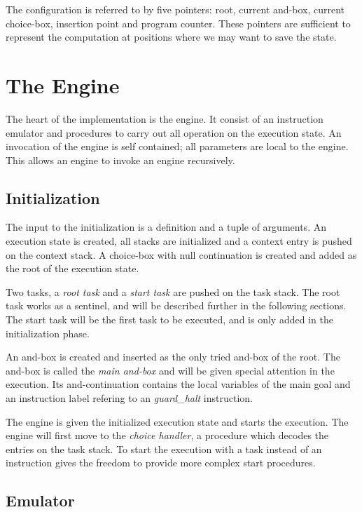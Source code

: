 The configuration is referred to by five pointers: root, current
and-box, current choice-box, insertion point and program counter.
These pointers are sufficient to represent the computation at
positions where we may want to save the state.


\section{The Engine}

The heart of the implementation is the engine. It consist of an
instruction emulator and procedures to carry out all operation on the
execution state. An invocation of the engine is self contained; all
parameters are local to the engine. This allows an engine to invoke an
engine recursively.


\subsection*{Initialization}

The input to the initialization is a definition and a tuple of
arguments. An execution state is created, all stacks are initialized
and a context entry is pushed on the context stack. A choice-box with
null continuation is created and added as the root of the execution
state.

Two tasks, a {\em root task} and a {\em start task} are pushed on the
task stack.  The root task works as a sentinel, and will be described
further in the following sections. The start task will be the first
task to be executed, and is only added in the initialization phase. 

An and-box is created and inserted as the only tried and-box of the
root. The and-box is called the {\em main and-box} and will be given
special attention in the execution. Its and-continuation contains the
local variables of the main goal and an instruction label refering to an
{\em guard\_halt} instruction. 

The engine is given the initialized execution state and starts the
execution. The engine will first move to the {\em choice handler}, a
procedure which decodes the entries on the task stack.  To start
the execution with a task instead of an instruction gives the freedom
to provide more complex start procedures.


\subsection*{Emulator}


